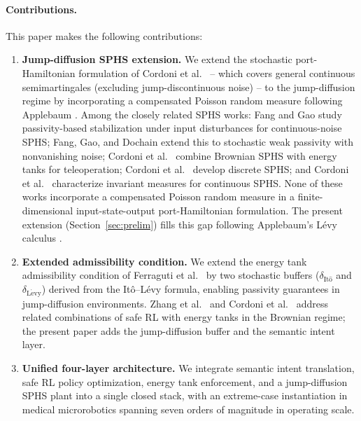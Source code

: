 \documentclass[11pt]{article}
\begin{document}
\paragraph{Contributions.} This paper makes the following contributions:
\begin{enumerate}
\item \textbf{Jump-diffusion SPHS extension.} We extend the stochastic port-Hamiltonian
  formulation of Cordoni et al.\ \cite{cordoni2022} -- which covers general continuous
  semimartingales (excluding jump-discontinuous noise) -- to the jump-diffusion regime by
  incorporating a compensated Poisson random measure following Applebaum \cite{applebaum2009}.
  Among the closely related SPHS works: Fang and Gao \cite{fang2017} study passivity-based
  stabilization under input disturbances for continuous-noise SPHS; Fang, Gao, and Dochain
  \cite{fang2023} extend this to stochastic weak passivity with nonvanishing noise; Cordoni
  et al.\ \cite{cordoni2021} combine Brownian SPHS with energy tanks for teleoperation;
  Cordoni et al.\ \cite{cordoni2022b} develop discrete SPHS; and Cordoni et al.\
  \cite{cordoni2025} characterize invariant measures for continuous SPHS. None of these works
  incorporate a compensated Poisson random measure in a finite-dimensional input-state-output
  port-Hamiltonian formulation. The present extension (Section~\ref{sec:prelim}) fills this
  gap following Applebaum's L\'{e}vy calculus \cite{applebaum2009}.

\item \textbf{Extended admissibility condition.} We extend the energy tank admissibility
  condition of Ferraguti et al.\ \cite{ferraguti2013,ferraguti2015} by two stochastic
  buffers ($\delta_{\mathrm{It\hat{o}}}$ and $\delta_{\mathrm{L\acute{e}vy}}$) derived
  from the It\^{o}--L\'{e}vy formula, enabling passivity guarantees in jump-diffusion
  environments. Zhang et al.\ \cite{zhang2025} and Cordoni et al.\ \cite{cordoni2021}
  address related combinations of safe RL with energy tanks in the Brownian regime; the
  present paper adds the jump-diffusion buffer and the semantic intent layer.

\item \textbf{Unified four-layer architecture.} We integrate semantic intent translation,
  safe RL policy optimization, energy tank enforcement, and a jump-diffusion SPHS plant
  into a single closed stack, with an extreme-case instantiation in medical microrobotics
  spanning seven orders of magnitude in operating scale.
\end{enumerate}
\end{document}
